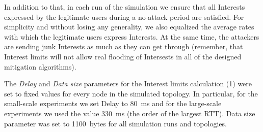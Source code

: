 In addition to that, in each run of the simulation we ensure that all Interests expressed by the legitimate users during a no-attack period are satisfied.
For simplicity and without losing any generality, we also equalized the average rates with which the legitimate users express Interests.
At the same time, the attackers are sending junk Interests as much as they can get through (remember, that Interest limits will not allow real flooding of Intersests in all of the designed mitigation algorithms).

The \emph{Delay} and \emph{Data size} parameters for the Interest limits calculation (1) were set to fixed values for every node in the simulated topology.
In particular, for the small-scale experiments we set Delay to 80~ms and for the large-scale experiments we used the value 330~ms (the order of the largest RTT).
Data size parameter was set to 1100~bytes for all simulation runs and topologies.




% 

